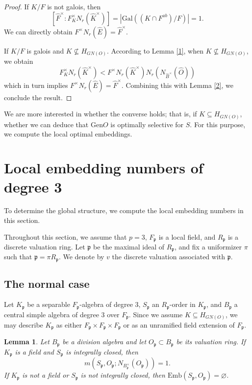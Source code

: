 \documentclass[12pt]{article}
\theoremstyle{plain}
\newtheorem{lemma}[theorem]{Lemma}
\theoremstyle{definition}
\theoremstyle{remark}
\begin{document}
\begin{proof}
If $K/F$ is not galois, then 
$$[\widehat{F}^\times:F^\times_K N_r(\widehat{K}^\times)]=|\mathrm{Gal}((K\cap F^{ab})/F)|=1.$$
We can directly obtain $F^\times N_r(\widehat{E})= \widehat{F}^\times$.

If $K/F$ is galois and $K\not \subseteq H_{GN(O)}$. According to Lemma \ref{1}, when $K\not \subseteq H_{GN(O)}$, we obtain $$F^\times_K N_r(\widehat{K}^\times)< F^\times N_r(\widehat{K}^\times)N_r(N_{\widehat{B}^\times}(\widehat{O}))$$ which in turn implies $F^\times N_r(\widehat{E})= \widehat{F}^\times$. Combining this with Lemma \ref{2}, we conclude the result.
\end{proof}

We are more interested in whether the converse holds; that is, if $K \subseteq H_{GN(O)}$, whether we can deduce that $\mathrm{Gen} O$ is optimally selective for $S$. For this purpose, we compute the local optimal embeddings. 


\section{Local embedding numbers of degree 3}
To determine the global structure, we compute the local embedding numbers in this section.

Throughout this section, we assume that $p=3$, $F_\mathfrak{p}$ is a local field, and $R_\mathfrak{p}$ is a discrete valuation ring. Let $\mathfrak{p}$ be the maximal ideal of $R_\mathfrak{p}$, and fix a uniformizer $\pi$ such that $\mathfrak{p}=\pi R_\mathfrak{p}$. We denote by $v$ the discrete valuation associated with $\mathfrak{p}$.

\subsection{The normal case}
Let $K_\mathfrak{p}$ be a separable $F_\mathfrak{p}$-algebra of degree 3, $S_\mathfrak{p}$ an $R_\mathfrak{p}$-order in $K_\mathfrak{p}$, and $B_\mathfrak{p}$ a central simple algebra of degree $3$ over $F_\mathfrak{p}$. Since we assume $K \subseteq H_{GN(O)}$, we may describe $K_\mathfrak{p}$ as either $F_\mathfrak{p}\times F_\mathfrak{p}\times F_\mathfrak{p}$ or as an unramified field extension of $F_\mathfrak{p}$.

\begin{lemma}
Let $B_\mathfrak{p}$ be a division algebra and let $O_\mathfrak{p}\subset B_\mathfrak{p}$ be its valuation ring. If $K_\mathfrak{p}$ is a field and $S_\mathfrak{p}$ is integrally closed, then
$$m(S_\mathfrak{p}, O_\mathfrak{p}; N_{B_\mathfrak{p}^\times}(O_\mathfrak{p})) = 1.$$
If $K_\mathfrak{p}$ is not a field or $S_\mathfrak{p}$ is not integrally closed, then $\mathrm{Emb}(S_\mathfrak{p}, O_\mathfrak{p}) = \varnothing$.
\end{lemma}
\end{document}
